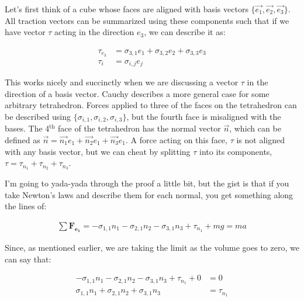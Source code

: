 Let's first think of a cube whose faces are aligned with basis vectors $\{\Vec{e_1}, \Vec{e_2}, \Vec{e_3}\}$. All traction vectors can be summarized using these components such that if we have vector $\tau$ acting in the direction $e_3$, we can describe it as:

\begin{equation} \label{phenom1}
\begin{split}
 \tau_{e_3} &= \sigma_{3,1}e_1 + \sigma_{3,2}e_2 + \sigma_{3,3}e_3\\
\tau_{i} &= \sigma_{i,j}e_j
\end{split}
\end{equation}

This works nicely and succinctly when we are discussing a vector $\tau$ in the direction of a basis vector. Cauchy describes a more general case for some arbitrary tetrahedron. Forces applied to three of the faces on the tetrahedron can be described using $\{\sigma_{i,1}, \sigma_{i,2}, \sigma_{i,3}\}$, but the fourth face is misaligned with the bases. The 4$^\mathrm{th}$ face of the tetrahedron has the normal vector $\Vec{n}$, which can be defined as $\Vec{n} = \Vec{n_1}e_1 + \Vec{n_2}e_1 + \Vec{n_3}e_1$. A force acting on this face, $\tau$ is not aligned with any basis vector, but we can cheat by splitting $\tau$ into its components, $\tau = \tau_{n_1} + \tau_{n_2}+ \tau_{n_3}$.\newline

I'm going to yada-yada through the proof a little bit, but the gist is that if you take Newton's laws and describe them for each normal, you get something along the lines of: 

\begin{equation} \label{phenom1}
\begin{split}
\sum \mathbf{F_{e_1}} = -\sigma_{1,1}n_1 - \sigma_{2,1}n_2 - \sigma_{3,1}n_3 + \tau_{n_1} + mg = ma
\end{split}
\end{equation}

Since, as mentioned earlier, we are taking the limit as the volume goes to zero, we can say that: 

\begin{equation} \label{phenom1}
\begin{split}
-\sigma_{1,1}n_1 - \sigma_{2,1}n_2 - \sigma_{3,1}n_3 + \tau_{n_1} + 0 &= 0 \\ 
\sigma_{1,1}n_1 + \sigma_{2,1}n_2 + \sigma_{3,1}n_3 &= \tau_{n_1}  \\ 
\end{split}
\end{equation}

